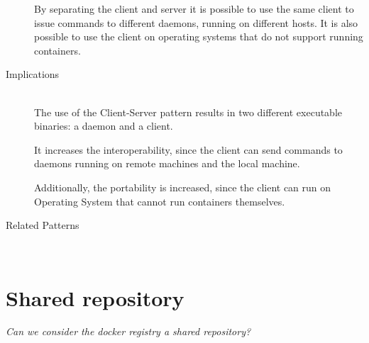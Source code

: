 \begin{description}
By separating the client and server it is possible to use the same client to issue commands to different daemons, running on different hosts.
It is also possible to use the client on operating systems that do not support running containers.

\item [Implications]~\\
The use of the Client-Server pattern results in two different executable binaries: a daemon and a client. 

It increases the interoperability, since the client can send commands to daemons running on remote machines and the local machine.

Additionally, the portability is increased, since the client can run on Operating System that cannot run containers themselves.


\item [Related Patterns]~\\


\end{description}

\section{Shared repository}
\textit{Can we consider the docker registry a shared repository?}

